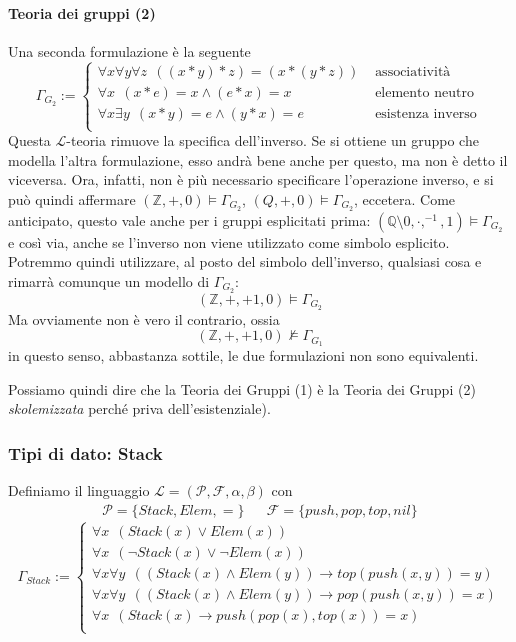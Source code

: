 \paragraph{Teoria dei gruppi (2)}
Una seconda formulazione è la seguente
$$
\Gamma_{G_2} := 
  \begin{cases}
    \forall x \forall y \forall z  ~~ ((x * y)*z) = (x*(y*z)) & \text{ associatività}\\
    \forall x ~~ (x * e) = x \land (e * x) = x & \text{ elemento neutro } \\
    \forall x \exists y ~~ (x * y) = e \land (y * x) = e & \text{ esistenza inverso} \\
  \end{cases}
$$
Questa $\mathscr{L}$-teoria rimuove la specifica dell'inverso. Se si ottiene un gruppo che modella l'altra formulazione, esso andrà bene anche per questo, ma non è detto il viceversa. 
Ora, infatti, non è più necessario specificare l'operazione inverso, 
e si può quindi affermare $(\mathbb{Z}, +, 0) \models \Gamma_{G_2}$, $(Q, +, 0) \models \Gamma_{G_2}$, 
eccetera. Come anticipato, questo vale anche per i gruppi esplicitati prima: 
$(\mathbb{Q}\setminus{0}, \cdot, ^{-1}, 1) \models \Gamma_{G_2}$ e così via, 
anche se l'inverso non viene utilizzato come simbolo esplicito. 
Potremmo quindi utilizzare, al posto del simbolo dell'inverso, qualsiasi cosa e 
rimarrà comunque un modello di $\Gamma_{G_2}$: 
$$
(\mathbb{Z}, +, +1, 0) \models \Gamma_{G_2}
$$
Ma ovviamente non è vero il contrario, ossia 
$$
(\mathbb{Z}, +, +1, 0) \nvDash \Gamma_{G_1}
$$
in questo senso, abbastanza sottile, le due formulazioni non sono equivalenti. 

Possiamo quindi dire che la Teoria dei Gruppi (1) è la Teoria dei Gruppi (2) \textit{skolemizzata} perché priva dell'esistenziale).

\subsubsection{Tipi di dato: Stack}
Definiamo il linguaggio $\mathscr{L}= (\mathscr{P}, \mathscr{F}, \alpha, \beta)$ 
con 
\begin{align*}
\mathscr{P} = \{Stack, Elem, =\} &&
\mathscr{F} = \{push, pop, top, nil\}
\end{align*}
$$
\Gamma_{Stack} := 
  \begin{cases}
    \forall x ~~ (Stack(x) \lor Elem(x)) \\
    \forall x ~~ (\neg Stack(x) \lor \neg Elem(x)) \\
    \forall x \forall y ~~ ((Stack(x) \land Elem(y)) \rightarrow top(push(x,y)) = y) \\
    \forall x \forall y ~~ ((Stack(x) \land Elem(y)) \rightarrow pop(push(x,y)) = x) \\
    \forall x ~~ (Stack(x) \rightarrow push(pop(x),top(x)) =x) \\
  \end{cases}
$$

